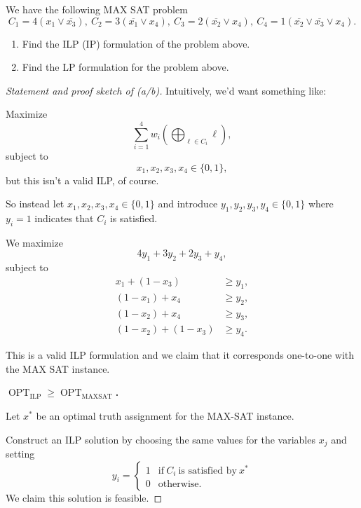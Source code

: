 \documentclass[11pt]{article}
\begin{document}
\begin{prob*}[4, Problem 3]
    We have the following MAX SAT problem 
    \[
        C_1 = 4(x_1\lor \overline{x_3}), \ C_2 
        = 3(\overline{x_1} \lor x_4), \ C_3 = 
        2(\overline{x_2} \lor x_4), \ 
        C_4 = 1(\overline{x_2} \lor \overline{x_3} 
        \lor x_4). 
    \]
    \begin{enumerate}[label=\alph*)]
        \item Find the ILP (IP) formulation 
            of the problem above. 
        \item Find the LP formulation for the problem 
            above. 
    \end{enumerate}
\end{prob*}

\begin{proof}[Statement and proof sketch of (a/b)]

    Intuitively,  
    we'd want something like: 
    
    Maximize 
    \[
        \sum_{i=1}^4 w_i\left(\bigoplus_{\ell \in C_i} \ell\right), 
    \]
    subject to 
    \[
        x_1,x_2,x_3,x_4 \in \{0,1\},  
    \]
    but this isn't a valid ILP, of course. 

    So instead let $x_1,x_2,x_3,x_4 \in \{0,1\}$ 
    and introduce $y_1,y_2,y_3,y_4 \in \{0,1\}$ 
    where $y_i = 1$ indicates that $C_i$ is satisfied. 

    We maximize 
    \[
        4y_1 + 3y_2 + 2y_3 + y_4, 
    \]
    subject to 
    \[
        \begin{aligned}
            x_1 + (1 - x_3) &\geq y_1, \\ 
            (1-x_1) + x_4   &\geq y_2, \\ 
            (1-x_2) + x_4   &\geq y_3, \\ 
        (1-x_2) + (1 - x_3) &\geq y_4.  
        \end{aligned}
    \]

    This is a valid ILP formulation and we claim 
    that it corresponds one-to-one with the MAX SAT instance. 

    \textbf{$\operatorname{OPT}_{\text{ILP}} 
    \geq \operatorname{OPT}_{\text{MAXSAT}}$.}

    Let $x^*$ be an optimal truth assignment 
    for the MAX-SAT instance. 
    
    Construct an ILP solution by choosing 
    the same values for the variables $x_j$ and 
    setting 
    \[
        y_i = 
        \begin{cases}
            1 & \text{if} \ C_i \ \text{is satisfied by} \ x^* \\ 
            0 & \text{otherwise}. 
        \end{cases}
    \]
    We claim this solution is feasible. 


\end{proof}
\end{document}
